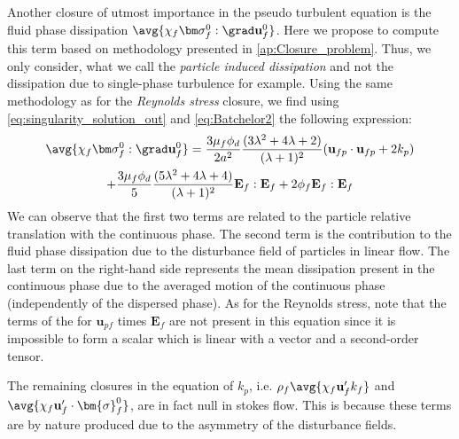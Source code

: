 Another closure of utmost importance in the pseudo turbulent equation is the fluid phase dissipation $\avg{\chi_f \bm\sigma_f^0 :\grad\textbf{u}_f^0}$. 
Here we propose to compute this term based on  methodology presented in \ref{ap:Closure_problem}. 
Thus, we only consider, what we call the \textit{particle induced dissipation} and not the dissipation due to single-phase turbulence for example.
Using the same methodology as for the \textit{Reynolds stress} closure, we find using \ref{eq:singularity_solution_out} and \ref{eq:Batchelor2} the following expression: 
\begin{multline}
    \avg{\chi_f \bm\sigma_f^0 :\grad\textbf{u}_f^0}
    =
    \frac{3\mu_f \phi_d}{2a^2}
    \frac{(3\lambda^2 + 4\lambda +2)}{(\lambda + 1)^2}
    (\textbf{u}_{fp}\cdot \textbf{u}_{fp} + 2 k_p ) \\
    + 
    \frac{3\mu_f \phi_d}{5}
    \frac{(5\lambda^2 + 4\lambda +4)}{(\lambda + 1)^2}
    \textbf{E}_f:\textbf{E}_f
    +2 \phi_f \textbf{E}_f:\textbf{E}_f
    \label{eq:dissipation_term}
\end{multline}
We can observe that the first two terms are related to the particle relative translation with the continuous phase. 
The second term is the contribution to the fluid phase dissipation due to the  disturbance field of particles in linear flow. 
The last term on the right-hand side represents the mean dissipation present in the continuous phase due to the averaged motion of the continuous phase (independently of the dispersed phase). 
As for the Reynolds stress, note that the terms of the for $\textbf{u}_{pf}$ times $\textbf{E}_f$ are not present in this equation since it is impossible to form a scalar which is linear with a vector and a second-order tensor. 



The remaining closures in the equation of $k_p$, i.e. $\rho_f \avg{\chi_f \textbf{u}_f' k_f}$ and $\avg{\chi_f \textbf{u}_f' \cdot \bm{\sigma}_f^0}$, are in fact null in stokes flow. 
This is because these terms are by nature produced due to the asymmetry of the disturbance fields. 


